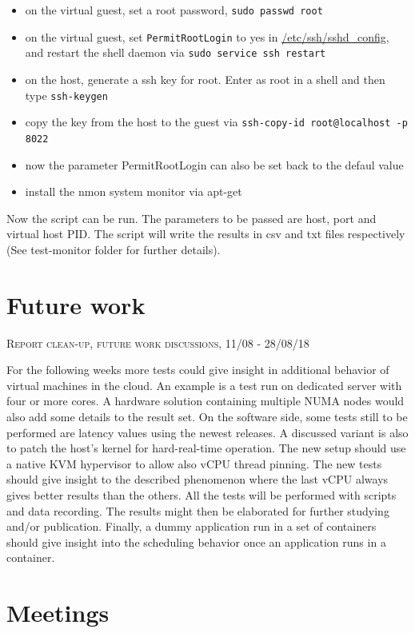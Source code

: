 \documentclass[]{scrartcl}
\begin{document}
\begin{itemize}
	\item on the virtual guest, set a root password, \texttt{sudo passwd root}
	\item on the virtual guest, set \texttt{PermitRootLogin} to yes in \url{/etc/ssh/sshd_config}, and restart the shell daemon via \texttt{sudo service ssh restart}
	\item on the host, generate a ssh key for root. Enter as root in a shell and then type \texttt{ssh-keygen}
	\item copy the key from the host to the guest via \texttt{ssh-copy-id root@localhost -p 8022}
	\item now the parameter PermitRootLogin can also be set back to the defaul value
	\item install the nmon system monitor via apt-get
\end{itemize}

Now the script can be run. The parameters to be passed are host, port and virtual host PID. The script will write the results in csv and txt files respectively (See test-monitor folder for further details). 

\section{Future work}

{\small\textsc{Report clean-up, future work discussions, 11/08 - 28/08/18} \bigskip}

For the following weeks more tests could give insight in additional behavior of virtual machines in the cloud. An example is a test run on dedicated server with four or more cores. A hardware solution containing multiple NUMA nodes would also add some details to the result set.
On the software side, some tests still to be performed are latency values using the newest releases. A discussed variant is also to patch the host's kernel for hard-real-time operation.
The new setup should use a native KVM hypervisor to allow also vCPU thread pinning. The new tests should give insight to the described phenomenon where the last vCPU always gives better results than the others.
All the tests will be performed with scripts and data recording. The results might then be elaborated for further studying and/or publication.
Finally, a dummy application run in a set of containers should give insight into the scheduling behavior once an application runs in a container.

\section{Meetings}
\label{sec:meeting}
\end{document}
